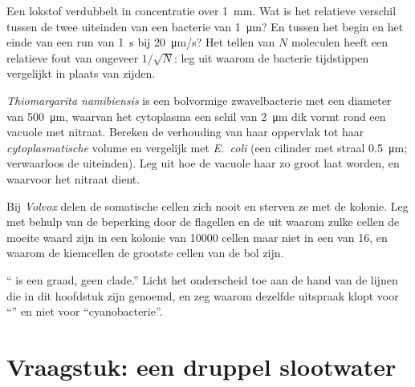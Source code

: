 \begin{exercise}[$\star\star$]\label{exo:b2:unicellular-diversity:9}
Een lokstof verdubbelt in concentratie over \qty{1}{mm}. Wat is het
relatieve verschil tussen de twee uiteinden van een bacterie van
\qty{1}{\micro m}? En tussen het begin en het einde van een run van
\qty{1}{s} bij \qty{20}{\micro m/s}? Het tellen van $N$ moleculen heeft
een relatieve fout van ongeveer $1/\sqrt{N}$: leg uit waarom de bacterie
tijdstippen vergelijkt in plaats van zijden.
\end{exercise}

\begin{exercise}[$\star\star\star$]\label{exo:b2:unicellular-diversity:10}
\emph{Thiomargarita namibiensis} is een bolvormige zwavelbacterie met
een diameter van \qty{500}{\micro m}, waarvan het cytoplasma een schil
van \qty{2}{\micro m} dik vormt rond een vacuole met nitraat. Bereken de
verhouding van haar oppervlak tot haar \emph{cytoplasmatische} volume en
vergelijk met \emph{E.~coli} (een cilinder met straal \qty{0.5}{\micro m};
verwaarloos de uiteinden). Leg uit hoe de vacuole haar zo groot laat
worden, en waarvoor het nitraat dient.
\end{exercise}

\begin{exercise}[$\star\star\star$]\label{exo:b2:unicellular-diversity:11}
Bij \emph{Volvox} delen de somatische cellen zich nooit en sterven ze met
de kolonie. Leg met behulp van de beperking door de flagellen en de  uit waarom zulke cellen de moeite waard zijn in een kolonie
van \num{10000} cellen maar niet in een van 16, en waarom de kiemcellen
de grootste cellen van de bol zijn.
\end{exercise}

\begin{exercise}[$\star\star\star$]\label{exo:b2:unicellular-diversity:12}
`` is een graad, geen clade.'' Licht het onderscheid toe aan de
hand van de lijnen die in dit hoofdstuk zijn genoemd, en zeg waarom
dezelfde uitspraak klopt voor ``'' en niet voor ``cyanobacterie''.
\end{exercise}

\section{Vraagstuk: een druppel slootwater}

